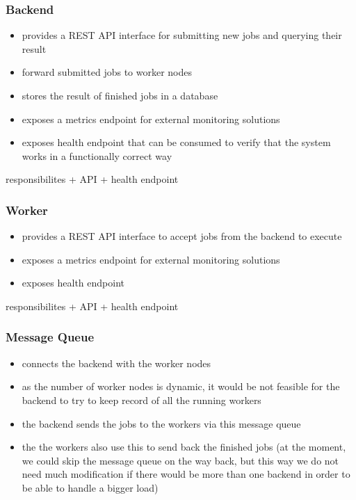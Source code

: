 \subsubsection{Backend}

\begin{itemize}
	\item provides a REST API interface for submitting new jobs and querying their result
	\item forward submitted jobs to worker nodes
	\item stores the result of finished jobs in a database
	\item exposes a metrics endpoint for external monitoring solutions
	\item exposes health endpoint that can be consumed to verify that the system works in a functionally correct way
\end{itemize}

responsibilites + API + health endpoint

\subsubsection{Worker}

\begin{itemize}
	\item provides a REST API interface to accept jobs from the backend to execute
	\item exposes a metrics endpoint for external monitoring solutions
	\item exposes health endpoint
\end{itemize}

responsibilites + API + health endpoint

\subsubsection{Message Queue}

\begin{itemize}
	\item connects the backend with the worker nodes
	\item as the number of worker nodes is dynamic, it would be not feasible for the backend to try to keep record of all the running workers
	\item the backend sends the jobs to the workers via this message queue
	\item the the workers also use this to send back the finished jobs (at the moment, we could skip the message queue on the way back, but this way we do not need much modification if there would be more than one backend in order to \eg be able to handle a bigger load)
\end{itemize}

